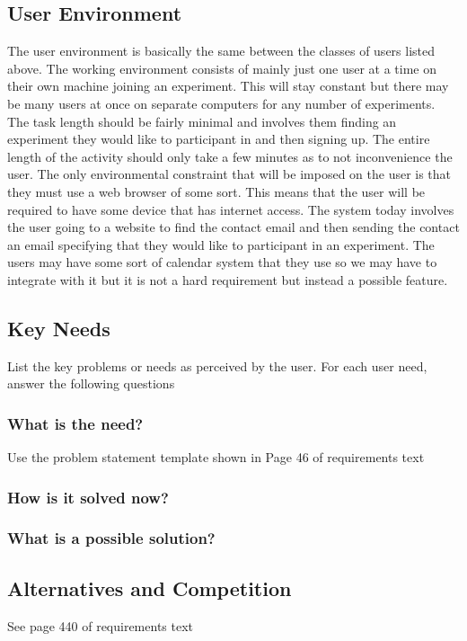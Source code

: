 \documentclass{article}
\begin{document}
\subsection{User Environment}
The user environment is basically the same between the classes of users listed above. The working environment consists of mainly just one user at a time on their own machine joining an experiment. This will stay constant but there may be many users at once on separate computers for any number of experiments. The task length should be fairly minimal and involves them finding an experiment they would like to participant in and then signing up. The entire length of the activity should only take a few minutes as to not inconvenience the user. The only environmental constraint that will be imposed on the user is that they must use a web browser of some sort. This means that the user will be required to have some device that has internet access. The system today involves the user going to a website to find the contact email and then sending the contact an email specifying that they would like to participant in an experiment. The users may have some sort of calendar system that they use so we may have to integrate with it but it is not a hard requirement but instead a possible feature.

\subsection{Key Needs}
List the key problems or needs as perceived by the user. For each user need, answer the following questions

\subsubsection{What is the need?}
Use the problem statement template shown in Page 46 of requirements text

\subsubsection{How is it solved now?}

\subsubsection{What is a possible solution?}

\subsection{Alternatives and Competition}
See page 440 of requirements text
\end{document}

